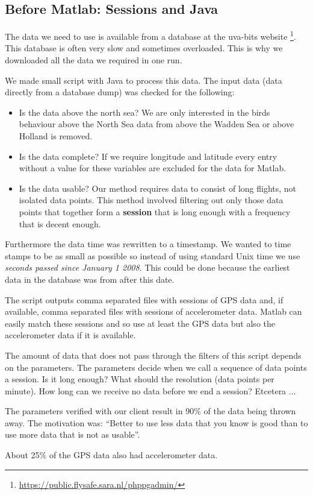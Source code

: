 \subsection{Before Matlab: Sessions and Java}
The data we need to use is available from a database at the uva-bits website
\footnote{\url{https://public.flysafe.sara.nl/phppgadmin/} }. This database is often very slow 
and sometimes overloaded. This is why we downloaded all the data we required in one run. 

We made small script with Java to process this data. The input data (data directly from a 
database dump) was checked for the following: 
\begin{itemize}
    \item Is the data above the north sea? We are only interested in the birds behaviour 
    above the North Sea data from above the Wadden Sea or above Holland is removed.
    \item Is the data complete? If we require longitude and latitude every entry 
    without a value for these variables are excluded for the data for Matlab. 
    \item Is the data usable? Our method requires data to consist of long flights,
    not isolated data points. This method involved filtering out only those data points
    that together form a \textbf{session} that is long enough with a frequency that is
    decent enough. 
\end{itemize}

Furthermore the data time was rewritten to a timestamp. We wanted to time stamps to be 
as small as possible so instead of using standard Unix time we use \textit{seconds passed
since 
January 1 2008}. This could be done because the earliest data in the database was from after
this date. 

The script outputs comma separated files with sessions of GPS data and, if available, comma
separated files with sessions of accelerometer data. Matlab can easily match these sessions
and so use at least the GPS data but also the accelerometer data if it is available. 

The amount of data that does not pass through the filters of this script depends on the 
parameters. The parameters decide when we call a sequence of data points a session. Is
it long enough? What should the resolution (data points per minute). How long can we receive
no data before we end a session? Etcetera ...

The parameters verified with our client result in 90\% of the data being thrown away. 
The motivation was: ``Better to use less data that you know is good than to use more data that 
is not as usable''. 

About 25\% of the GPS data also had accelerometer data.



